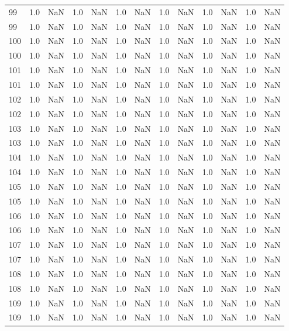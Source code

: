 \begin{tabular}{lrrrrrrrrrrrr}
99 & 1.0 & NaN & 1.0 & NaN & 1.0 & NaN & 1.0 & NaN & 1.0 & NaN & 1.0 & NaN \\
99 & 1.0 & NaN & 1.0 & NaN & 1.0 & NaN & 1.0 & NaN & 1.0 & NaN & 1.0 & NaN \\
100 & 1.0 & NaN & 1.0 & NaN & 1.0 & NaN & 1.0 & NaN & 1.0 & NaN & 1.0 & NaN \\
100 & 1.0 & NaN & 1.0 & NaN & 1.0 & NaN & 1.0 & NaN & 1.0 & NaN & 1.0 & NaN \\
101 & 1.0 & NaN & 1.0 & NaN & 1.0 & NaN & 1.0 & NaN & 1.0 & NaN & 1.0 & NaN \\
101 & 1.0 & NaN & 1.0 & NaN & 1.0 & NaN & 1.0 & NaN & 1.0 & NaN & 1.0 & NaN \\
102 & 1.0 & NaN & 1.0 & NaN & 1.0 & NaN & 1.0 & NaN & 1.0 & NaN & 1.0 & NaN \\
102 & 1.0 & NaN & 1.0 & NaN & 1.0 & NaN & 1.0 & NaN & 1.0 & NaN & 1.0 & NaN \\
103 & 1.0 & NaN & 1.0 & NaN & 1.0 & NaN & 1.0 & NaN & 1.0 & NaN & 1.0 & NaN \\
103 & 1.0 & NaN & 1.0 & NaN & 1.0 & NaN & 1.0 & NaN & 1.0 & NaN & 1.0 & NaN \\
104 & 1.0 & NaN & 1.0 & NaN & 1.0 & NaN & 1.0 & NaN & 1.0 & NaN & 1.0 & NaN \\
104 & 1.0 & NaN & 1.0 & NaN & 1.0 & NaN & 1.0 & NaN & 1.0 & NaN & 1.0 & NaN \\
105 & 1.0 & NaN & 1.0 & NaN & 1.0 & NaN & 1.0 & NaN & 1.0 & NaN & 1.0 & NaN \\
105 & 1.0 & NaN & 1.0 & NaN & 1.0 & NaN & 1.0 & NaN & 1.0 & NaN & 1.0 & NaN \\
106 & 1.0 & NaN & 1.0 & NaN & 1.0 & NaN & 1.0 & NaN & 1.0 & NaN & 1.0 & NaN \\
106 & 1.0 & NaN & 1.0 & NaN & 1.0 & NaN & 1.0 & NaN & 1.0 & NaN & 1.0 & NaN \\
107 & 1.0 & NaN & 1.0 & NaN & 1.0 & NaN & 1.0 & NaN & 1.0 & NaN & 1.0 & NaN \\
107 & 1.0 & NaN & 1.0 & NaN & 1.0 & NaN & 1.0 & NaN & 1.0 & NaN & 1.0 & NaN \\
108 & 1.0 & NaN & 1.0 & NaN & 1.0 & NaN & 1.0 & NaN & 1.0 & NaN & 1.0 & NaN \\
108 & 1.0 & NaN & 1.0 & NaN & 1.0 & NaN & 1.0 & NaN & 1.0 & NaN & 1.0 & NaN \\
109 & 1.0 & NaN & 1.0 & NaN & 1.0 & NaN & 1.0 & NaN & 1.0 & NaN & 1.0 & NaN \\
109 & 1.0 & NaN & 1.0 & NaN & 1.0 & NaN & 1.0 & NaN & 1.0 & NaN & 1.0 & NaN \\

\end{tabular}
